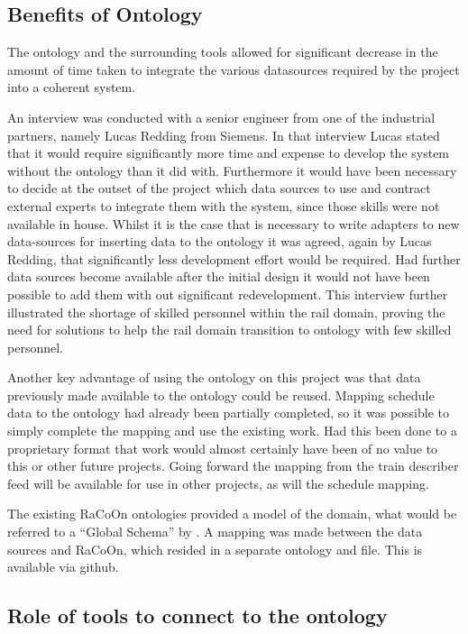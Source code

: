 \subsection{Benefits of Ontology}
The ontology and the surrounding tools allowed for significant decrease in the amount of time taken to integrate the various datasources required by the project into a coherent system. 

An interview was conducted with a senior engineer from one of the industrial partners, namely Lucas Redding from Siemens. In that interview Lucas stated that it would require significantly more time and expense to develop the system without the ontology than it did with. Furthermore it would have been necessary to decide at the outset of the project which data sources to use and contract external experts to integrate them with the system, since those skills were not available in house. Whilst it is the case that is necessary to write adapters to new data-sources for inserting data to the ontology it was agreed, again by Lucas Redding, that significantly less development effort would be required. Had further data sources become available after the initial design it would not have been possible to add them with out significant redevelopment. This interview further illustrated the shortage of skilled personnel within the rail domain, proving the need for solutions to help the rail domain transition to ontology with few skilled personnel. 

Another key advantage of using the ontology on this project was that data previously made available to the ontology could be reused. Mapping schedule data to the ontology had already been partially completed, so it was possible to simply complete the mapping and use the existing work. Had this been done to a proprietary format that work would almost certainly have been of no value to this or other future projects. Going forward the mapping from the train describer feed will be available for use in other projects, as will the schedule mapping.

The existing RaCoOn ontologies provided a model of the domain, what would be referred to a ``Global Schema'' by \citet{Lenzerini2002}. A mapping was made between the data sources and RaCoOn, which resided in a separate ontology and file. This is available via github.

\subsection{Role of tools to connect to the ontology}
 
